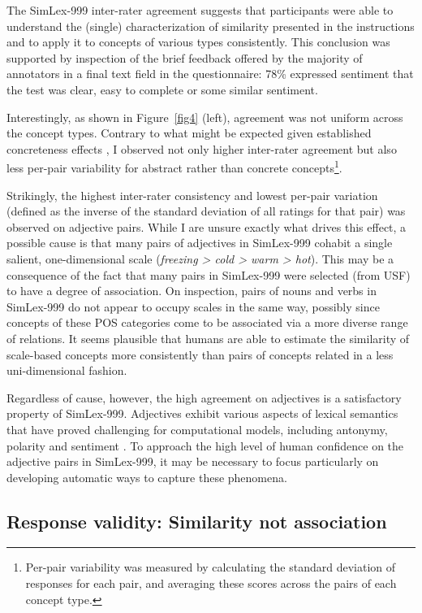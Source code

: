 The SimLex-999 inter-rater agreement suggests that participants were able to understand the (single) characterization of similarity presented in the instructions and to apply it to concepts of various types consistently. This conclusion was supported by inspection of the brief feedback offered by the majority of annotators in a final text field in the questionnaire: 78\% expressed sentiment that the test was clear, easy to complete or some similar sentiment.

Interestingly, as shown in Figure~\ref{fig4} (left), agreement was not uniform across the concept types. Contrary to what might be expected given established concreteness effects \cite{paivio1991dual}, I observed not only higher inter-rater agreement but also less per-pair variability for abstract rather than concrete concepts\footnote{Per-pair variability was measured by calculating the standard deviation of responses for each pair, and averaging these scores across the pairs of each concept type.}. 

Strikingly, the highest inter-rater consistency and lowest per-pair variation (defined as the inverse of the standard deviation of all ratings for that pair) was observed on adjective pairs. While I are unsure exactly what drives this effect, a possible cause is that many pairs of adjectives in SimLex-999 cohabit a single salient, one-dimensional scale (\emph{freezing > cold > warm > hot}). This may be a consequence of the fact that many pairs in SimLex-999 were selected (from USF) to have a degree of association. On inspection, pairs of nouns and verbs in SimLex-999 do not appear to occupy scales in the same way, possibly since concepts of these POS categories come to be associated via a more diverse range of relations. It seems plausible that humans are able to estimate the similarity of scale-based concepts more consistently than pairs of concepts related in a less uni-dimensional fashion. 

Regardless of cause, however, the high agreement on adjectives is a satisfactory property of SimLex-999. Adjectives exhibit various aspects of lexical semantics that have proved challenging for computational models, including antonymy, polarity \cite{williams2009predicting} and sentiment \cite{wiebe2000learning}. To approach the high level of human confidence on the adjective pairs in SimLex-999, it may be necessary to focus particularly on developing automatic ways to capture these phenomena. 

\subsection{Response validity: Similarity not association}	



